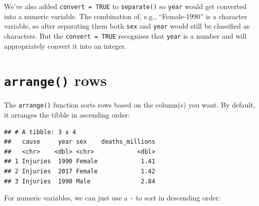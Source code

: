 \documentclass[
  12pt,
  krantz2]{krantz}
\makeatletter
\newenvironment{Shaded}{\begin{snugshade}}{\end{snugshade}}
\newcommand{\CommentTok}[1]{\textcolor[rgb]{0.56,0.35,0.01}{\textit{#1}}}
\newcommand{\DecValTok}[1]{\textcolor[rgb]{0.00,0.00,0.81}{#1}}
\newcommand{\KeywordTok}[1]{\textcolor[rgb]{0.13,0.29,0.53}{\textbf{#1}}}
\newcommand{\NormalTok}[1]{#1}
\newcommand{\OperatorTok}[1]{\textcolor[rgb]{0.81,0.36,0.00}{\textbf{#1}}}
\newcommand{\StringTok}[1]{\textcolor[rgb]{0.31,0.60,0.02}{#1}}
\newenvironment{kframe}{%
\medskip{}
\setlength{\fboxsep}{.8em}
 \def\at@end@of@kframe{}%
 \ifinner\ifhmode%
  \def\at@end@of@kframe{\end{minipage}}%
  \begin{minipage}{\columnwidth}%
 \fi\fi%
 \def\FrameCommand##1{\hskip\@totalleftmargin \hskip-\fboxsep
 \colorbox{shadecolor}{##1}\hskip-\fboxsep
     \hskip-\linewidth \hskip-\@totalleftmargin \hskip\columnwidth}%
 \MakeFramed {\advance\hsize-\width
   \@totalleftmargin\z@ \linewidth\hsize
   \@setminipage}}%
 {\par\unskip\endMakeFramed%
 \at@end@of@kframe}
\renewenvironment{Shaded}{\begin{kframe}}{\end{kframe}}
\makeatother
\begin{document}
We've also added \texttt{convert\ =\ TRUE} to \texttt{separate()} so \texttt{year} would get converted into a numeric variable.
The combination of, e.g., ``Female-1990'' is a character variable, so after separating them both \texttt{sex} and \texttt{year} would still be classified as characters.
But the \texttt{convert\ =\ TRUE} recognises that \texttt{year} is a number and will appropriately convert it into an integer.

\hypertarget{arrange-rows}{%
\section{\texorpdfstring{\texttt{arrange()} rows}{arrange() rows}}\label{arrange-rows}}


The \texttt{arrange()} function sorts rows based on the column(s) you want. By default, it arranges the tibble in ascending order:

\begin{Shaded}
\end{Shaded}

\begin{verbatim}
## # A tibble: 3 x 4
##   cause     year sex    deaths_millions
##   <chr>    <dbl> <chr>            <dbl>
## 1 Injuries  1990 Female            1.41
## 2 Injuries  2017 Female            1.42
## 3 Injuries  1990 Male              2.84
\end{verbatim}

For numeric variables, we can just use a \texttt{-} to sort in descending order:

\begin{Shaded}
\end{Shaded}
\end{document}
